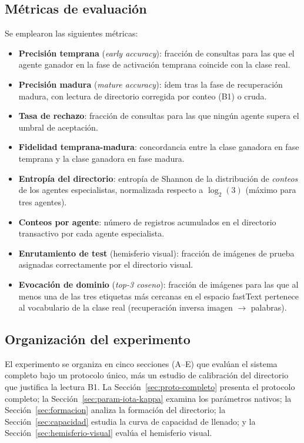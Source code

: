 \subsection{Métricas de evaluación}
\label{sec:metricas}

Se emplearon las siguientes métricas:

\begin{itemize}
    \item \textbf{Precisión temprana} (\textit{early accuracy}): fracción de consultas para las que el agente ganador en la fase de activación temprana coincide con la clase real.
    \item \textbf{Precisión madura} (\textit{mature accuracy}): ídem tras la fase de recuperación madura, con lectura de directorio corregida por conteo (B1) o cruda.
    \item \textbf{Tasa de rechazo}: fracción de consultas para las que ningún agente supera el umbral de aceptación.
    \item \textbf{Fidelidad temprana-madura}: concordancia entre la clase ganadora en fase temprana y la clase ganadora en fase madura.
    \item \textbf{Entropía del directorio}: entropía de Shannon de la distribución de \textit{conteos} de los agentes especialistas, normalizada respecto a $\log_2(3)$ (máximo para tres agentes).
    \item \textbf{Conteos por agente}: número de registros acumulados en el directorio transactivo por cada agente especialista.
    \item \textbf{Enrutamiento de test} (hemisferio visual): fracción de imágenes de prueba asignadas correctamente por el directorio visual.
    \item \textbf{Evocación de dominio} (\textit{top-3 coseno}): fracción de imágenes para las que al menos una de las tres etiquetas más cercanas en el espacio fastText pertenece al vocabulario de la clase real (recuperación inversa imagen $\to$ palabras).
\end{itemize}

\subsection{Organización del experimento}
\label{sec:organizacion}

El experimento se organiza en cinco secciones (A--E) que evalúan el sistema completo bajo un protocolo único, más un estudio de calibración del directorio que justifica la lectura B1.
La Sección~\ref{sec:proto-completo} presenta el protocolo completo; la Sección~\ref{sec:param-iota-kappa} examina los parámetros nativos; la Sección~\ref{sec:formacion} analiza la formación del directorio; la Sección~\ref{sec:capacidad} estudia la curva de capacidad de llenado; y la Sección~\ref{sec:hemisferio-visual} evalúa el hemisferio visual.
